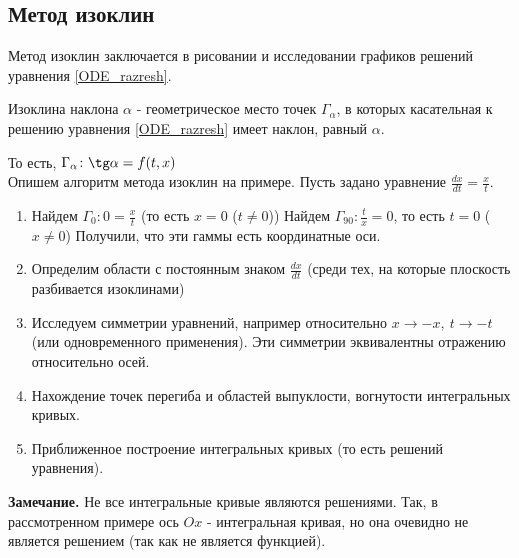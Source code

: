 \subsection{Метод изоклин}
Метод изоклин заключается в рисовании и исследовании графиков решений 
уравнения \ref{ODE_razresh}. 
\begin{defin}
Изоклина наклона $\alpha$ - геометрическое место точек $\Gamma_\alpha$, в 
которых касательная к решению уравнения \ref{ODE_razresh} имеет наклон, равный
$\alpha$.
\end{defin}
То есть, $\Gamma_\alpha\colon \tg\alpha=f(t,x)$\\
Опишем алгоритм метода изоклин на примере. Пусть задано уравнение 
$\frac{dx}{dt}=\frac{x}{t}$. 
\begin{enumerate}
    \item Найдем $\Gamma_0:0=\frac{x}{t}$ (то есть $x=0$ ($t\ne0$))
     Найдем $\Gamma_{90}:\frac{t}{x}=0$, то есть $t=0$ ($x\ne0$) 
    Получили, что эти гаммы есть координатные оси. 
    \item Определим области с постоянным знаком $\frac{dx}{dt}$ (среди тех,
        на которые плоскость разбивается изоклинами) 
    \item Исследуем симметрии уравнений, например относительно 
    $x\to-x,~t\to-t$ (или одновременного применения). Эти симметрии
    эквивалентны отражению относительно осей.
    \item Нахождение точек перегиба и областей выпуклости, вогнутости 
интегральных кривых.  
    \item Приближенное построение интегральных кривых (то есть решений 
        уравнения).
\end{enumerate}
\textbf{Замечание.} Не все интегральные кривые являются решениями. Так, в 
рассмотренном примере ось $Ox$ - интегральная кривая, но она очевидно не 
является решением (так как не является функцией). 

